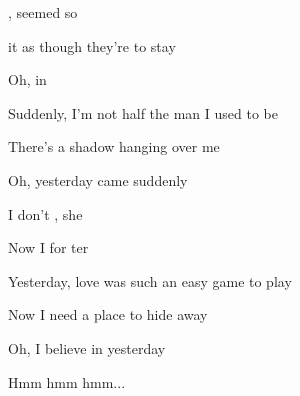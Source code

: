 

\zs
{},   seemed so  

 it  as though they're  to stay 

Oh,  in 
\ks

\zs
Suddenly, I'm not half the man I used to be

There's a shadow hanging over me

Oh, yesterday came suddenly
\ks

\zr
{}    

I don't , she  

    

Now I  for ter
\kr

\zs
Yesterday, love was such an easy game to play

Now I need a place to hide away

Oh, I believe in yesterday

Hmm hmm hmm...
\ks

\kp


















